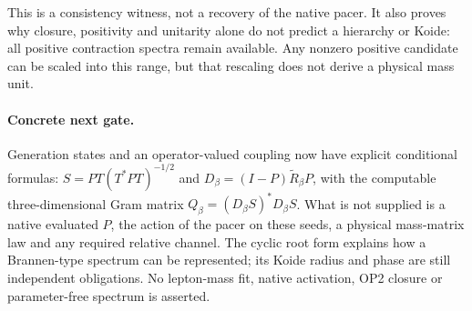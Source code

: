 This is a consistency witness, not a recovery of the native pacer.
It also proves why closure, positivity and unitarity alone do not
predict a hierarchy or Koide: all positive contraction spectra remain
available. Any nonzero positive candidate can be scaled into this
range, but that rescaling does not derive a physical mass unit.

\paragraph{Concrete next gate.}
Generation states and an operator-valued coupling now have explicit
conditional formulas: $S=PT(T^*PT)^{-1/2}$ and
$D_\beta=(I-P)\widetilde R_\beta P$, with the computable
three-dimensional Gram matrix $Q_\beta=(D_\beta S)^*D_\beta S$.
What is not supplied is a native evaluated $P$, the action of the
pacer on these seeds, a physical mass-matrix law and any required
relative channel. The cyclic root form explains how a Brannen-type
spectrum can be represented; its Koide radius and phase are still
independent obligations. No lepton-mass fit, native activation,
OP2 closure or parameter-free spectrum is asserted.

